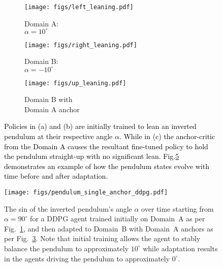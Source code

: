 \documentclass[letterpaper, 10 pt, conference]{ieeeconf} %
\newcommand{\rev}[1]{\textcolor{black}{#1}}
\begin{document}
        \begin{figure}[h]
        \begin{subfigure}{.32\columnwidth}
          \centering
          \texttt{[image: figs/left\_leaning.pdf]}
          \caption{Domain A: \\ \hspace*{0.35cm} $\alpha = 10^\circ$}
          \label{fig:left_pendulum}
        \end{subfigure}%
        \begin{subfigure}{.32\columnwidth}
            \centering
            \texttt{[image: figs/right\_leaning.pdf]}
            \caption{Domain B: \\ \hspace*{0.35cm} $\alpha = -10^\circ$}
            \label{fig:right_pendulum}
        \end{subfigure}
        \begin{subfigure}{.32\columnwidth}
            \centering
            \texttt{[image: figs/up\_leaning.pdf]}
            \caption{Domain B with\\ \hspace*{0.35cm} Domain A anchor}
            \label{fig:up_pendulum}
        \end{subfigure}
        \caption{\rev{
            Policies in (a) and (b) are initially trained to lean an inverted pendulum at their respective angle $\alpha$. While in (c) the anchor-critic from the Domain A causes the resultant fine-tuned policy to hold the pendulum straight-up with no significant lean.
            Fig.\ref{fig:ddpg_anchor_pendulum} demonstrates an example of how the pendulum states evolve with time before and after adaptation.
        }}
        \label{fig:pendulum_overview}
        \end{figure}
        
        \begin{figure}[h]
            \centering
            \texttt{[image: figs/pendulum\_single\_anchor\_ddpg.pdf]}
            \caption{
                The sin of the inverted pendulum's angle $\alpha$ over time starting from $\alpha = 90^\circ$ for a DDPG agent trained initially on Domain~A as per Fig.~\ref{fig:left_pendulum}, and then adapted to Domain~B with Domain~A anchors as per Fig.~\ref{fig:up_pendulum}.
                Note that initial training allows the agent to stably balance the pendulum to approximately $10^\circ$ while adaptation results in the agents driving the pendulum to approximately $0^\circ$.
            }
            \label{fig:ddpg_anchor_pendulum}
            \vspace{-\baselineskip}
        \end{figure}
\end{document}
